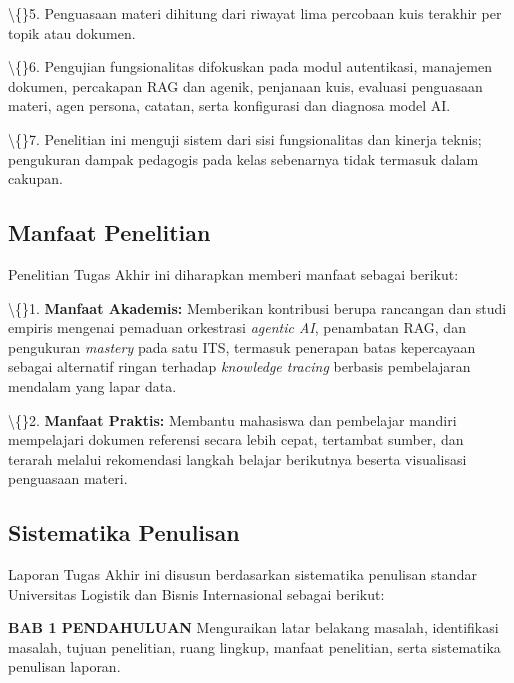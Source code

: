 \documentclass[12pt,a4paper]{article}
\begin{document}
\textbackslash\{\}5. Penguasaan materi dihitung dari riwayat lima percobaan kuis terakhir per topik atau dokumen.



\textbackslash\{\}6. Pengujian fungsionalitas difokuskan pada modul autentikasi, manajemen dokumen, percakapan RAG dan agenik, penjanaan kuis, evaluasi penguasaan materi, agen persona, catatan, serta konfigurasi dan diagnosa model AI.



\textbackslash\{\}7. Penelitian ini menguji sistem dari sisi fungsionalitas dan kinerja teknis; pengukuran dampak pedagogis pada kelas sebenarnya tidak termasuk dalam cakupan.



\subsection*{Manfaat Penelitian}

Penelitian Tugas Akhir ini diharapkan memberi manfaat sebagai berikut:



\textbackslash\{\}1. \textbf{Manfaat Akademis:} Memberikan kontribusi berupa rancangan dan studi empiris mengenai pemaduan orkestrasi \textit{agentic AI}, penambatan RAG, dan pengukuran \textit{mastery} pada satu ITS, termasuk penerapan batas kepercayaan sebagai alternatif ringan terhadap \textit{knowledge tracing} berbasis pembelajaran mendalam yang lapar data.



\textbackslash\{\}2. \textbf{Manfaat Praktis:} Membantu mahasiswa dan pembelajar mandiri mempelajari dokumen referensi secara lebih cepat, tertambat sumber, dan terarah melalui rekomendasi langkah belajar berikutnya beserta visualisasi penguasaan materi.



\subsection*{Sistematika Penulisan}

Laporan Tugas Akhir ini disusun berdasarkan sistematika penulisan standar Universitas Logistik dan Bisnis Internasional sebagai berikut:



\textbf{BAB 1 PENDAHULUAN}  Menguraikan latar belakang masalah, identifikasi masalah, tujuan penelitian, ruang lingkup, manfaat penelitian, serta sistematika penulisan laporan.
\end{document}
